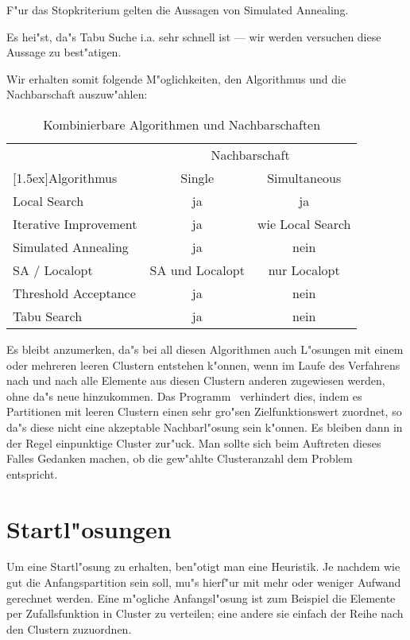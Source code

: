 F"ur das Stopkriterium gelten die Aussagen von Simulated Annealing.

Es hei"st, da"s Tabu Suche i.a. sehr schnell ist --- wir werden versuchen
diese Aussage zu best"atigen.

Wir erhalten somit folgende M"oglichkeiten, den Algorithmus und
die Nachbarschaft auszuw"ahlen:

\begin{table}[htp]
\begin{center}
\begin{tabular}{|l|c|c|}
\hline
& \multicolumn{2}{c|}{Nachbarschaft}\\
 \raisebox{1.5ex}[1.5ex]{Algorithmus} & Single & Simultaneous \\
 \hline
 Local Search & ja & ja \\
 Iterative Improvement & ja & wie Local Search \\
 Simulated Annealing & ja & nein\\
 SA / Localopt & SA und Localopt & nur Localopt\\
 Threshold Acceptance & ja & nein\\
 Tabu Search & ja & nein\\
 \hline
\end{tabular}
\end{center}
\caption{Kombinierbare Algorithmen und Nachbarschaften}
\end{table}

Es bleibt anzumerken, da"s bei all diesen Algorithmen auch L"osungen mit
einem oder mehreren leeren Clustern entstehen k"onnen, wenn im Laufe
des Verfahrens nach und nach alle Elemente aus diesen Clustern anderen
zugewiesen werden, ohne da"s neue hinzukommen. Das Programm \Clustering\
verhindert dies, indem es Partitionen mit leeren Clustern einen sehr gro"sen
Zielfunktionswert zuordnet, so da"s diese nicht eine akzeptable
Nachbarl"osung sein k"onnen. Es bleiben dann in der Regel
einpunktige Cluster zur"uck. Man sollte sich beim Auftreten dieses Falles
Gedanken machen, ob die gew"ahlte Clusteranzahl dem Problem entspricht.

\section{Startl"osungen}
Um eine Startl"osung zu erhalten, ben"otigt man eine Heuristik.
Je nachdem wie gut die Anfangspartition sein soll, mu"s hierf"ur
mit mehr oder weniger Aufwand gerechnet werden.
Eine m"ogliche Anfangsl"osung ist zum Beispiel die Elemente
per Zufallsfunktion in Cluster zu verteilen; eine andere sie einfach
der Reihe nach den Clustern zuzuordnen.

